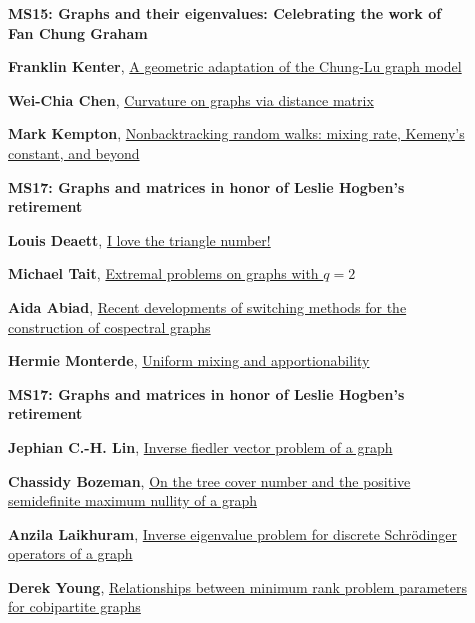 \documentclass[ILAS2025-program.tex]{subfiles}
\begin{document}
        \begin{description}
    \item[] {\color{mstitle}\textbf{MS15: Graphs and their eigenvalues: Celebrating the work of Fan Chung Graham}} 
    \item[] \hypertarget{up0138}{}\textbf{Franklin Kenter}, \hyperlink{down0138}{A geometric adaptation of the Chung-Lu graph model}
        \item[] \hypertarget{up0139}{}\textbf{Wei-Chia Chen}, \hyperlink{down0139}{Curvature on graphs via distance matrix}
        \item[] \hypertarget{up0140}{}\textbf{Mark Kempton}, \hyperlink{down0140}{Nonbacktracking random walks: mixing rate, Kemeny's constant, and beyond}
        \end{description}
    \begin{description}
    \item[] {\color{mstitle}\textbf{MS17: Graphs and matrices in honor of Leslie Hogben's retirement}} 
    \item[] \hypertarget{up0177}{}\textbf{Louis Deaett}, \hyperlink{down0177}{I love the triangle number!}
        \item[] \hypertarget{up0178}{}\textbf{Michael Tait}, \hyperlink{down0178}{Extremal problems on graphs with $q=2$}
        \item[] \hypertarget{up0179}{}\textbf{Aida Abiad}, \hyperlink{down0179}{Recent developments of switching methods for the construction of cospectral graphs}
        \item[] \hypertarget{up0180}{}\textbf{Hermie Monterde}, \hyperlink{down0180}{Uniform mixing and apportionability
}
        \end{description}
    \begin{description}
    \item[] {\color{mstitle}\textbf{MS17: Graphs and matrices in honor of Leslie Hogben's retirement}} 
    \item[] \hypertarget{up0221}{}\textbf{Jephian C.-H. Lin}, \hyperlink{down0221}{Inverse fiedler vector problem of a graph
}
        \item[] \hypertarget{up0222}{}\textbf{Chassidy Bozeman}, \hyperlink{down0222}{On the tree cover number and the positive semidefinite maximum nullity of a graph}
        \item[] \hypertarget{up0223}{}\textbf{Anzila Laikhuram}, \hyperlink{down0223}{Inverse eigenvalue problem for discrete Schrödinger operators of a graph}
        \item[] \hypertarget{up0224}{}\textbf{Derek Young}, \hyperlink{down0224}{Relationships between minimum rank problem parameters for cobipartite graphs}
        \end{description}
    \newpage
\end{document}
